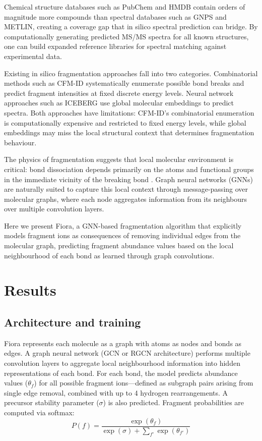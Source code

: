 \documentclass[11pt]{article}
\begin{document}
Chemical structure databases such as PubChem and HMDB contain orders of magnitude more compounds than spectral databases such as GNPS and METLIN, creating a coverage gap that in silico spectral prediction can bridge. By computationally generating predicted MS/MS spectra for all known structures, one can build expanded reference libraries for spectral matching against experimental data.

Existing in silico fragmentation approaches fall into two categories. Combinatorial methods such as CFM-ID \citep{allen2015cfm} systematically enumerate possible bond breaks and predict fragment intensities at fixed discrete energy levels. Neural network approaches such as ICEBERG \citep{goldman2023iceberg} use global molecular embeddings to predict spectra. Both approaches have limitations: CFM-ID's combinatorial enumeration is computationally expensive and restricted to fixed energy levels, while global embeddings may miss the local structural context that determines fragmentation behaviour.

The physics of fragmentation suggests that local molecular environment is critical: bond dissociation depends primarily on the atoms and functional groups in the immediate vicinity of the breaking bond \citep{allen2015cfm}. Graph neural networks (GNNs) are naturally suited to capture this local context through message-passing over molecular graphs, where each node aggregates information from its neighbours over multiple convolution layers.

Here we present Fiora, a GNN-based fragmentation algorithm that explicitly models fragment ions as consequences of removing individual edges from the molecular graph, predicting fragment abundance values based on the local neighbourhood of each bond as learned through graph convolutions.

\section{Results}

\subsection{Architecture and training}

Fiora represents each molecule as a graph with atoms as nodes and bonds as edges. A graph neural network (GCN or RGCN architecture) performs multiple convolution layers to aggregate local neighbourhood information into hidden representations of each bond. For each bond, the model predicts abundance values ($\theta_f$) for all possible fragment ions---defined as subgraph pairs arising from single edge removal, combined with up to 4 hydrogen rearrangements. A precursor stability parameter ($\sigma$) is also predicted. Fragment probabilities are computed via softmax:
\begin{equation}
    P(f) = \frac{\exp(\theta_f)}{\exp(\sigma) + \sum_{f'} \exp(\theta_{f'})}
\end{equation}
\end{document}
